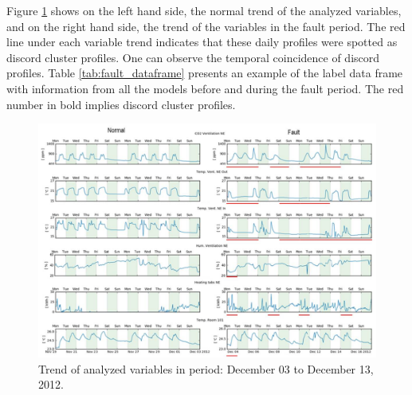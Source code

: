 Figure \ref{fig:complete_fault_trends} shows on the left hand side, the normal trend of the analyzed variables, and on the right hand side, the trend of the variables in the fault period. The red line under each variable trend indicates that these daily profiles were spotted as discord cluster profiles. One can observe the temporal coincidence of discord profiles. Table \ref{tab:fault_dataframe} presents an example of the label data frame with information from all the models before and during the fault period. The red number in bold implies discord cluster profiles.


\begin{figure}[h!]
  \vspace{0.5em} %
  \includegraphics[scale=0.82]{Figures/complete_fault_trends.jpg}
  \caption{Trend of analyzed variables in period: December 03 to December 13, 2012.}
  \label{fig:complete_fault_trends}
\end{figure}



